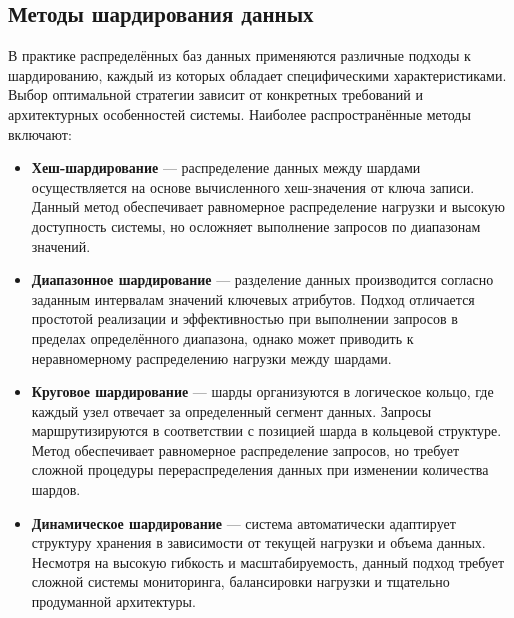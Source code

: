 \subsection{Методы шардирования данных}

В практике распределённых баз данных применяются различные подходы к
шардированию, каждый из которых обладает специфическими характеристиками. Выбор
оптимальной стратегии зависит от конкретных требований и архитектурных
особенностей системы. Наиболее распространённые методы включают:

\begin{itemize}
    \item \textbf{Хеш-шардирование} — распределение данных между шардами
    осуществляется на основе вычисленного хеш-значения от ключа записи. Данный
    метод обеспечивает равномерное распределение нагрузки и высокую доступность
    системы, но осложняет выполнение запросов по диапазонам значений.

    \item \textbf{Диапазонное шардирование} — разделение данных производится
    согласно заданным интервалам значений ключевых атрибутов. Подход отличается
    простотой реализации и эффективностью при выполнении запросов в пределах
    определённого диапазона, однако может приводить к неравномерному
    распределению нагрузки между шардами.

    \item \textbf{Круговое шардирование} — шарды организуются в логическое
    кольцо, где каждый узел отвечает за определенный сегмент данных. Запросы
    маршрутизируются в соответствии с позицией шарда в кольцевой структуре.
    Метод обеспечивает равномерное распределение запросов, но требует сложной
    процедуры перераспределения данных при изменении количества шардов.

    \item \textbf{Динамическое шардирование} — система автоматически адаптирует
    структуру хранения в зависимости от текущей нагрузки и объема данных.
    Несмотря на высокую гибкость и масштабируемость, данный подход требует
    сложной системы мониторинга, балансировки нагрузки и тщательно продуманной
    архитектуры.
\end{itemize}

